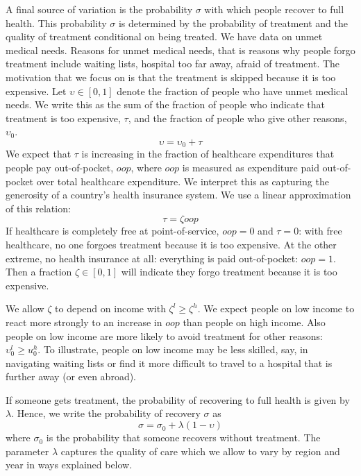 \documentclass[a4paper,12pt]{article}
\begin{document}
A final source of variation is the probability \(\sigma\) with which people recover to full health. This probability \(\sigma\) is determined by the probability of treatment and the quality of treatment conditional on being treated. We have data on unmet medical needs. Reasons for unmet medical needs, that is reasons why people forgo treatment include waiting lists, hospital too far away, afraid of treatment. The motivation that we focus on is that the treatment is skipped because it is too expensive. Let \(\upsilon \in [0,1]\) denote the fraction of people who have unmet medical needs. We write this as the sum of the fraction of people who indicate that treatment is too expensive, \(\tau\), and the fraction of people who give other reasons, \(\upsilon_0\).
\begin{equation}
\label{eq:3}
\upsilon = \upsilon_0 + \tau
\end{equation}
We expect that \(\tau\) is increasing in the fraction of healthcare expenditures that people pay out-of-pocket, \(oop\), where \(oop\) is measured as expenditure paid out-of-pocket over total healthcare expenditure. We interpret this as capturing the generosity of a country's health insurance system. We use a linear approximation of this relation:
\begin{equation}
\label{eq:4}
\tau = \zeta oop
\end{equation}
If healthcare is completely free at point-of-service, \(oop=0\) and \(\tau=0\): with free healthcare, no one forgoes treatment because it is too expensive. At the other extreme, no health insurance at all: everything is paid out-of-pocket: \(oop=1\). Then a fraction \(\zeta \in [0,1]\) will indicate they forgo treatment because it is too expensive.

We allow \(\zeta\) to depend on income with \(\zeta^l \geq \zeta^h\). We expect people on low income to react more strongly to an increase in \(oop\) than people on high income. Also people on low income are more likely to avoid treatment for other reasons: \(\upsilon_0^l \geq u_0^h\). To illustrate, people on low income may be less skilled, say, in navigating waiting lists or find it more difficult to travel to a hospital that is further away (or even abroad).

If someone gets treatment, the probability of recovering to full health is given by \(\lambda\). Hence, we write the probability of recovery \(\sigma\) as
\begin{equation}
\label{eq:5}
\sigma = \sigma_0 + \lambda (1-\upsilon)
\end{equation}
where \(\sigma_0\) is the probability that someone recovers without treatment. The parameter \(\lambda\) captures the quality of care which we allow to vary by region and year in ways explained below.
\end{document}
